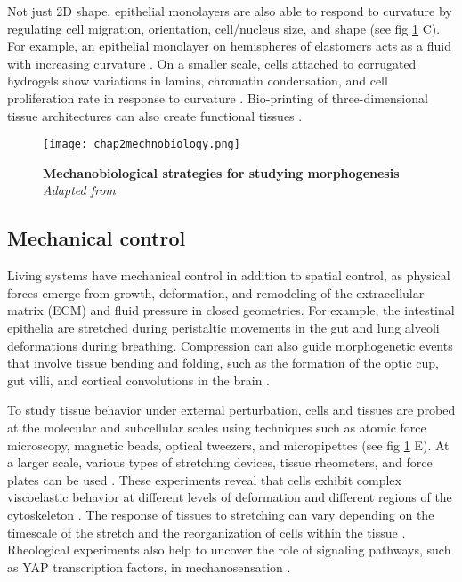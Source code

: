 Not just 2D shape, epithelial monolayers are also able to respond to curvature by regulating cell migration, orientation, cell/nucleus size, and shape \cite{marin-llaurado2022, schamberger2022} (see fig \ref{fig_2_2} C). For example, an epithelial monolayer on hemispheres of elastomers acts as a fluid with increasing curvature \cite{tang2022}. On a smaller scale, cells attached to corrugated hydrogels show variations in lamins, chromatin condensation, and cell proliferation rate in response to curvature \cite{luciano2021}. Bio-printing of three-dimensional tissue architectures can also create functional tissues \cite{brassard2021,  breau2022}.

\begin{figure}[h!]
	\centering
	\texttt{[image: chap2mechnobiology.png]}
	\caption{\label{fig_2_2} \textbf{Mechanobiological strategies for studying morphogenesis} \textit{Adapted from \cite{vianello2019}}}
\end{figure}

\hypertarget{mechanical-control}{%
\subsection{Mechanical control}\label{mechanical-control}}

Living systems have mechanical control in addition to spatial control, as physical forces emerge from growth, deformation, and remodeling of the extracellular matrix (ECM) and fluid pressure in closed geometries. For example, the intestinal epithelia are stretched during peristaltic movements in the gut and lung alveoli deformations during breathing. Compression can also guide morphogenetic events that involve tissue bending and folding, such as the formation of the optic cup, gut villi, and cortical convolutions in the brain \cite{okuda2018, shyer2013, tallinen2016}.

To study tissue behavior under external perturbation, cells and tissues are probed at the molecular and subcellular scales using techniques such as atomic force microscopy, magnetic beads, optical tweezers, and micropipettes \cite{bao2003} (see fig \ref{fig_2_2} E). At a larger scale, various types of stretching devices, tissue rheometers, and force plates can be used \cite{xi2018}. These experiments reveal that cells exhibit complex viscoelastic behavior at different levels of deformation and different regions of the cytoskeleton \cite{mofrad2009}. The response of tissues to stretching can vary depending on the timescale of the stretch and the reorganization of
cells within the tissue \cite{guillot2013}. Rheological experiments also help to uncover the role of signaling pathways, such as YAP transcription factors, in mechanosensation \cite{wagh2021}.

